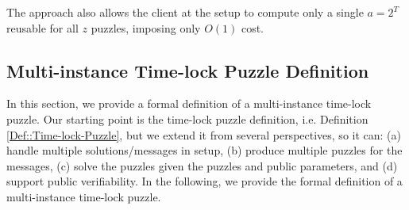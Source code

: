     The approach also allows  the client at the setup to compute only a single $a=2^{\scriptscriptstyle T}$  reusable for all $z$ puzzles, imposing only $O(1)$  cost. 

\vspace{-5mm}

\subsection{Multi-instance   Time-lock Puzzle Definition}\label{Section::Multi-instance-Time-lock Puzzle-Definition}

\vspace{-1mm}

In this section, we provide a formal definition of a multi-instance time-lock puzzle. Our starting point is the  time-lock puzzle definition, i.e. Definition \ref{Def::Time-lock-Puzzle}, but we extend it from several  perspectives, so it can: (a) handle multiple  solutions/messages in setup, (b)  produce multiple puzzles for the messages,   (c) solve the puzzles given the puzzles and public parameters, and (d) support public verifiability. In the following, we provide the formal definition of a multi-instance  time-lock puzzle.
